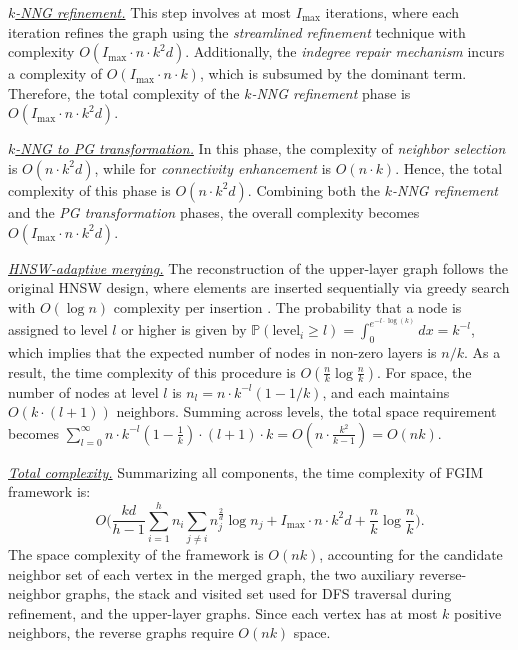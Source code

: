 \documentclass[acmsmall]{acmart}
\theoremstyle{remark}
\theoremstyle{definition}
\begin{document}
\noindent\underline{\textit{$k$-NNG refinement.}} This step involves at most $I_{\max}$ iterations, where each iteration refines the graph using the \textit{streamlined refinement} technique with complexity $O(I_{\max} \cdot n \cdot k^2 d)$. Additionally, the \textit{indegree repair mechanism} incurs a complexity of $O(I_{\max} \cdot n \cdot k)$, which is subsumed by the dominant term. Therefore, the total complexity of the \textit{$k$-NNG refinement} phase is $O(I_{\max} \cdot n \cdot k^2 d)$.

\noindent\underline{\textit{$k$-NNG to PG transformation.}} In this phase, the complexity of \textit{neighbor selection} is $O(n \cdot k^2 d)$, while for \textit{connectivity enhancement} is $O(n \cdot k)$. Hence, the total complexity of this phase is $O(n \cdot k^2 d)$. Combining both the \textit{$k$-NNG refinement} and the \textit{PG transformation} phases, the overall complexity becomes $O(I_{\max} \cdot n \cdot k^2 d)$.

\noindent\underline{\textit{HNSW-adaptive merging.}} The reconstruction of the upper-layer graph follows the original HNSW design, where elements are inserted sequentially via greedy search with $O(\log n)$ complexity per insertion \cite{malkov2018efficient, wang2021comprehensive}. The probability that a node is assigned to level $l$ or higher is given by $\mathbb{P}(\text{level}_i \geq l) = \int_0^{e^{-l \cdot \log(k)}} dx = k^{-l}$, which implies that the expected number of nodes in non-zero layers is $n/k$. As a result, the time complexity of this procedure is $O\left(\frac{n}{k} \log \frac{n}{k}\right)$. For space, the number of nodes at level $l$ is $n_l = n \cdot k^{-l}(1 - 1/k)$, and each maintains $O(k \cdot (l+1))$ neighbors. Summing across levels, the total space requirement becomes $\sum_{l=0}^\infty n \cdot k^{-l} \left(1 - \frac{1}{k} \right) \cdot (l + 1) \cdot k = O\left(n \cdot \frac{k^2}{k - 1}\right)=O(nk)$.

\noindent\underline{\textit{Total complexity.}} Summarizing all components, the time complexity of FGIM framework is: $$O\big(\frac{kd}{h - 1} \sum_{i=1}^{h} n_i \sum_{j \neq i} n_{j}^{\frac{2}{d}} \log n_j + I_{\max} \cdot n \cdot k^2d + \frac{n}{k} \log \frac{n}{k}\big).$$ The space complexity of the framework is $O(nk)$, accounting for the candidate neighbor set of each vertex in the merged graph, the two auxiliary reverse-neighbor graphs, the stack and visited set used for DFS traversal during refinement, and the upper-layer graphs. Since each vertex has at most $k$ positive neighbors, the reverse graphs require $O(nk)$ space.
\end{document}
